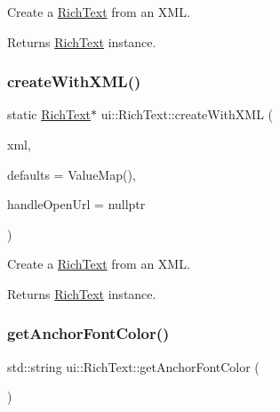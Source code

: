 Create a \hyperlink{classui_1_1RichText}{Rich\+Text} from an X\+ML. 

\begin{DoxyReturn}{Returns}
\hyperlink{classui_1_1RichText}{Rich\+Text} instance. 
\end{DoxyReturn}
\mbox{\label{classui_1_1RichText_a90c6d73c16d60b0f32308edb67415116}} 
\subsubsection{\texorpdfstring{create\+With\+X\+M\+L()}{createWithXML()}\hspace{0.1cm}{\footnotesize\ttfamily [2/2]}}
{\footnotesize\ttfamily static \hyperlink{classui_1_1RichText}{Rich\+Text}$\ast$ ui\+::\+Rich\+Text\+::create\+With\+X\+ML (\begin{DoxyParamCaption}\item[{const std\+::string \&}]{xml,  }\item[{const Value\+Map \&}]{defaults = {\ttfamily ValueMap()},  }\item[{const \hyperlink{classui_1_1RichText_ad3631ae61d204f1d9576f5923bbd762e}{Open\+Url\+Handler} \&}]{handle\+Open\+Url = {\ttfamily nullptr} }\end{DoxyParamCaption})\hspace{0.3cm}{\ttfamily [static]}}



Create a \hyperlink{classui_1_1RichText}{Rich\+Text} from an X\+ML. 

\begin{DoxyReturn}{Returns}
\hyperlink{classui_1_1RichText}{Rich\+Text} instance. 
\end{DoxyReturn}
\mbox{\label{classui_1_1RichText_a3d776737d4159673aab16af9b46d19e6}} 
\subsubsection{\texorpdfstring{get\+Anchor\+Font\+Color()}{getAnchorFontColor()}\hspace{0.1cm}{\footnotesize\ttfamily [1/2]}}
{\footnotesize\ttfamily std\+::string ui\+::\+Rich\+Text\+::get\+Anchor\+Font\+Color (\begin{DoxyParamCaption}{ }\end{DoxyParamCaption})}

